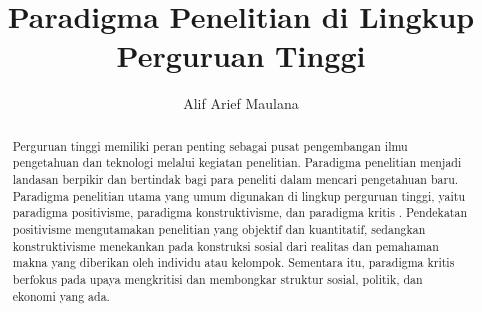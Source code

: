 \documentclass[10pt, a4paper]{article}
\begin{document}
\title{\textbf{Paradigma Penelitian di Lingkup Perguruan Tinggi}}
\author{Alif Arief Maulana}

\maketitle


\begin{abstract}
    Perguruan tinggi memiliki peran penting sebagai pusat pengembangan ilmu pengetahuan dan teknologi melalui kegiatan penelitian. Paradigma penelitian menjadi landasan berpikir dan bertindak bagi para peneliti dalam mencari pengetahuan baru. Paradigma penelitian utama yang umum digunakan di lingkup perguruan tinggi, yaitu paradigma positivisme, paradigma konstruktivisme, dan paradigma kritis \cite{creswell2014research, guba1994competing, smith1983quantitative}. Pendekatan positivisme mengutamakan penelitian yang objektif dan kuantitatif, sedangkan konstruktivisme menekankan pada konstruksi sosial dari realitas dan pemahaman makna yang diberikan oleh individu atau kelompok. Sementara itu, paradigma kritis berfokus pada upaya mengkritisi dan membongkar struktur sosial, politik, dan ekonomi yang ada.

\end{abstract}








\printbibliography
\end{document}
